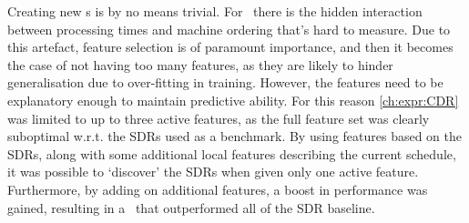 \documentclass[smallextended]{svjour3}
\begin{document}
Creating new \dr s is by no means trivial. For \jsp\ there is 
the hidden interaction between processing times and machine ordering that's 
hard to measure.
Due to this artefact, feature selection is of paramount importance, and then it 
becomes the case of not having too many features, as they are likely to hinder 
generalisation due to over-fitting in training. However, the features need to 
be explanatory enough to maintain predictive ability. 
For this reason \cref{ch:expr:CDR} was limited to up to three active features, 
as the full feature set was clearly suboptimal w.r.t. the SDRs used as a 
benchmark. 
By using features based on the SDRs, along with some additional local features 
describing the current schedule, it was possible to `discover' the SDRs when 
given only one active feature. %
Furthermore, by adding on additional features, a boost in performance was 
gained, resulting in a \cdr\ that outperformed all of the 
SDR baseline. 
\end{document}
